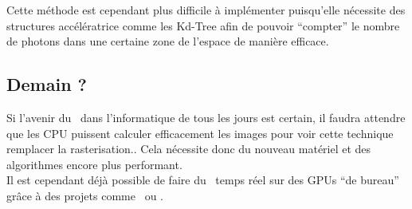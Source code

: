 Cette méthode est cependant plus difficile à implémenter puisqu'elle nécessite
des structures accélératrice comme les Kd-Tree afin de pouvoir ``compter'' le
nombre de photons dans une certaine zone de l'espace de manière efficace.


\subsection{Demain ?}
Si l'avenir du \raytracing{}\ dans l'informatique de tous les jours est
certain, il faudra attendre que les CPU puissent calculer efficacement les
images pour voir cette technique remplacer la rasterisation.. Cela nécessite
donc du nouveau matériel et des algorithmes encore plus performant.\\

Il est cependant déjà possible de faire du \raytracing{}\ temps réel sur des
\glspl{GPU} ``de bureau'' grâce à des projets comme \ ou
.
